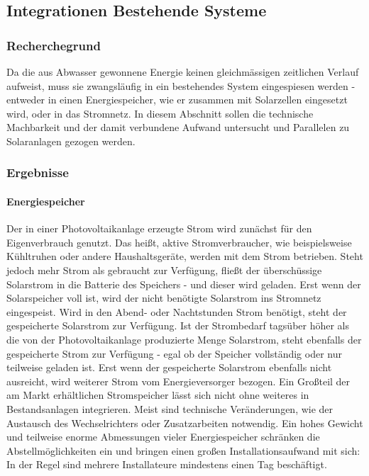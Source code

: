\subsection{Integrationen Bestehende Systeme}

\subsubsection{Recherchegrund}
Da die aus Abwasser gewonnene Energie keinen gleichmässigen zeitlichen Verlauf aufweist, muss sie zwangsläufig in ein bestehendes System eingespiesen werden - entweder in einen Energiespeicher, wie er zusammen mit Solarzellen eingesetzt wird, oder in das Stromnetz. In diesem Abschnitt sollen die technische Machbarkeit und der damit verbundene Aufwand untersucht und Parallelen zu Solaranlagen gezogen werden.


\subsubsection{Ergebnisse}
\paragraph{Energiespeicher}
Der in einer Photovoltaikanlage erzeugte Strom wird zunächst für den Eigenverbrauch genutzt. Das heißt, aktive Stromverbraucher, wie beispielsweise Kühltruhen oder andere Haushaltsgeräte, werden mit dem Strom betrieben. Steht jedoch mehr Strom als gebraucht zur Verfügung, fließt der überschüssige Solarstrom in die Batterie des Speichers - und dieser wird geladen. Erst wenn der Solarspeicher voll ist, wird der nicht benötigte Solarstrom ins Stromnetz eingespeist.
Wird in den Abend- oder Nachtstunden Strom benötigt, steht der gespeicherte Solarstrom zur Verfügung. Ist der Strombedarf tagsüber höher als die von der Photovoltaikanlage produzierte Menge Solarstrom, steht ebenfalls der gespeicherte Strom zur Verfügung - egal ob der Speicher vollständig oder nur teilweise geladen ist. Erst wenn der gespeicherte Solarstrom ebenfalls nicht ausreicht, wird weiterer Strom vom Energieversorger bezogen.
Ein Großteil der am Markt erhältlichen Stromspeicher lässt sich nicht ohne weiteres in Bestandsanlagen integrieren. Meist sind technische Veränderungen, wie der Austausch des Wechselrichters oder Zusatzarbeiten notwendig. Ein hohes Gewicht und teilweise enorme Abmessungen vieler Energiespeicher schränken die Abstellmöglichkeiten ein und bringen einen großen Installationsaufwand mit sich: In der Regel sind mehrere Installateure mindestens einen Tag beschäftigt.

